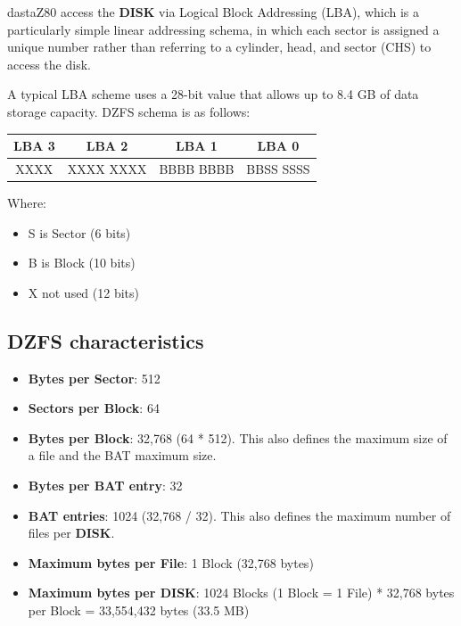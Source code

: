 \documentclass[a4paper,11pt]{article}
\begin{document}
    dastaZ80 access the \textbf{DISK} via Logical Block Addressing (LBA), which
    is a particularly simple linear addressing schema, in which each sector is
    assigned a unique number rather than referring to a cylinder, head, and
    sector (CHS) to access the disk.
    
    A typical LBA scheme uses a 28-bit value that allows up to 8.4 GB of data
    storage capacity. DZFS schema is as follows:

    \begin{tabular}{ c c c c }
        \hline
        LBA 3 & LBA 2 & LBA 1 & LBA 0\\
        \hline
        XXXX & XXXX XXXX & BBBB BBBB & BBSS SSSS\\
        \hline
    \end{tabular}

    Where:

    \begin{itemize}
        \item S is Sector (6 bits)
        \item B is Block (10 bits)
        \item X not used (12 bits)
    \end{itemize}

    \subsection{DZFS characteristics}

    \begin{itemize}
        \item \textbf{Bytes per Sector}: 512
        \item \textbf{Sectors per Block}: 64
        \item \textbf{Bytes per Block}: 32,768 (64 * 512). This also defines the
        maximum size of a file and the BAT maximum size.
        \item \textbf{Bytes per BAT entry}: 32
        \item \textbf{BAT entries}: 1024 (32,768 / 32). This also defines the 
        maximum number of files per \textbf{DISK}.
        \item \textbf{Maximum bytes per File}: 1 Block (32,768 bytes)
        \item \textbf{Maximum bytes per DISK}: 1024 Blocks (1 Block = 1 File)
        * 32,768 bytes per Block = 33,554,432 bytes (33.5 MB)
    \end{itemize}
\end{document}

